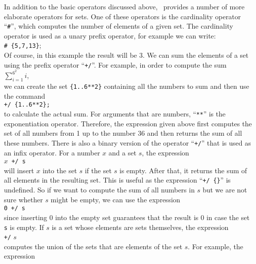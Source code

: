 In addition to the basic operators discussed above,
\setlx\ provides a number of more elaborate operators for sets.  One of these operators is
the cardinality operator ``\texttt{\#}'', which computes the number of elements of a 
given set.  The cardinality operator is used as a unary prefix operator, for example we can write:
\\[0.2cm]
\hspace*{1.3cm}
\texttt{\# \{5,7,13\}};
\\[0.2cm]
Of course, in this example the result will be $3$.
We can sum the elements of a set using the prefix operator
``\texttt{+/}''.  For example, in order to
compute the sum 
\\[0.2cm]
\hspace*{1.3cm}
$\sum\limits_{i=1}^{6^2} i$,
\\[0.2cm]
we can create the set \texttt{\{1..6**2\}} containing all the numbers
to sum and then use the command
\\[0.2cm]
\hspace*{1.3cm}
\texttt{+/ \{1..6**2\}; }
\\[0.2cm]
to calculate the actual sum.
For arguments that are numbers, ``\texttt{**}'' is the exponentiation operator.
Therefore, the expression given above 
first computes the set of all numbers from 1 up to the number 36 and then returns the sum
of all these numbers.  There is also a binary version of the operator ``\texttt{+/}'' that
is used as an infix operator.  For a number $x$ and a set $s$, the expression
\\[0.2cm]
\hspace*{1.3cm}
\texttt{$x$ +/ s}
\\[0.2cm]
will insert $x$ into the set $s$ if the set $s$ is empty.  After that, it returns the sum of all elements in the
resulting set.  This is useful as the expression ``\texttt{+/ \{\}}'' is undefined.  So
if we want to compute the sum of all numbers in $s$ but we are not sure whether $s$ might
be empty, we can use the expression
\\[0.2cm]
\hspace*{1.3cm}
\texttt{0 +/ s}
\\[0.2cm]
since inserting $0$ into the empty set guarantees that the result is 0 in case  the set
\texttt{s} is empty.  If $s$ is a set whose elements are sets themselves, the expression
\\[0.2cm]
\hspace*{1.3cm}
\texttt{+/} $s$
\\[0.2cm]
computes the union of the sets that are elements of the set $s$.  For example, the expression
